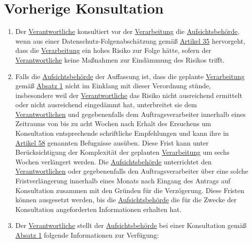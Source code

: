 \chapter{Vorherige Konsultation}
\label{ch:36}


\begin{enumerate}

  \item Der \hyperref[itm:04-7]{Verantwortliche} konsultiert vor der \hyperref[itm:04-2]{Verarbeitung} die \hyperref[itm:04-21]{Aufsichtsbehörde}, wenn aus einer
   Datenschutz-Folgenabschätzung gemäß \hyperref[ch:35]{Artikel 35} hervorgeht, dass die \hyperref[itm:04-2]{Verarbeitung} ein hohes Risiko
   zur Folge hätte, sofern der \hyperref[itm:04-7]{Verantwortliche} keine Maßnahmen zur Eindämmung des Risikos trifft.
  \label{itm:36-1}

  \item Falls die \hyperref[itm:04-21]{Aufsichtsbehörde} der Auffassung ist, dass die geplante \hyperref[itm:04-2]{Verarbeitung} gemäß \hyperref[itm:36-1]
   {Absatz 1} nicht im Einklang mit dieser Verordnung stünde, insbesondere weil der \hyperref[itm:04-7]{Verantwortliche} das Risiko nicht
   ausreichend ermittelt oder nicht ausreichend eingedämmt hat, unterbreitet sie dem \hyperref[itm:04-7]{Verantwortlichen} und
   gegebenenfalls dem Auftragsverarbeiter innerhalb eines Zeitraums von bis zu acht Wochen nach Erhalt des Ersuchens um
   Konsultation entsprechende schriftliche Empfehlungen und kann ihre in \hyperref[ch:58]{Artikel 58} genannten
   Befugnisse ausüben. Diese Frist kann unter Berücksichtigung der Komplexität der geplanten \hyperref[itm:04-2]{Verarbeitung} um sechs
   Wochen verlängert werden. Die \hyperref[itm:04-21]{Aufsichtsbehörde} unterrichtet den \hyperref[itm:04-7]{Verantwortlichen} oder gegebenenfalls den
   Auftragsverarbeiter über eine solche Fristverlängerung innerhalb eines Monats nach Eingang des Antrags auf
   Konsultation zusammen mit den Gründen für die Verzögerung. Diese Fristen können ausgesetzt werden, bis die
   \hyperref[itm:04-21]{Aufsichtsbehörde} die für die Zwecke der Konsultation angeforderten Informationen erhalten hat.
  \label{itm:36-2}

  \item Der \hyperref[itm:04-7]{Verantwortliche} stellt der \hyperref[itm:04-21]{Aufsichtsbehörde} bei einer Konsultation gemäß \hyperref[itm:36-1]{Absatz 1}
   folgende Informationen zur Verfügung:
  \label{itm:36-3}


\end{enumerate}
